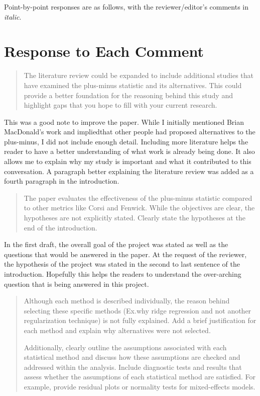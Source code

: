 \documentclass[12pt]{article}
\newenvironment{comment}%
{\begin{quotation}\noindent\small\it\ignorespaces%
  }{\end{quotation}}
\begin{document}
Point-by-point responses are as follows, with the reviewer/editor's comments in {\it italic}.


\section{Response to Each Comment}

\begin{comment}
  The literature review could be expanded to include additional studies that 
  have examined the plus-minus statistic and its alternatives. This could provide 
  a better foundation for the reasoning behind this study and highlight gaps
  that you hope to fill with your current research.
\end{comment}

This was a good note to improve the paper. While I initially mentioned Brian MacDonald's 
work and impliedthat other people had proposed alternatives to the plus-minus, I did not 
include enough detail. Including more literature helps the reader to have a better understanding
of what work is already being done. It also allows me to explain why my study is 
important and what it contributed to this conversation. A paragraph better explaining 
the literature review was added as a fourth paragraph in the introduction.


\begin{comment}
  The paper evaluates the effectiveness of the plus-minus statistic compared 
  to other metrics like Corsi and Fenwick. While the objectives are clear, the 
  hypotheses are not explicitly stated. Clearly state the hypotheses at the end 
  of the introduction.
\end{comment}

In the first draft, the overall goal of the project was stated as well as the 
questions that would be answered in the paper. At the request of the reviewer,
the hypothesis of the project was stated in the second to last sentence of the
introduction. Hopefully this helps the readers to understand the over-arching 
question that is being answered in this project.

\begin{comment}
  Although each method is described individually, the reason behind selecting these 
  specific methods (Ex.why ridge regression and not another regularization technique) 
  is not fully explained. Add a brief justification for each method and explain why 
  alternatives were not selected.

  Additionally, clearly outline the assumptions associated with each statistical 
  method and discuss how these assumptions are checked and addressed within the 
  analysis. Include diagnostic tests and results that assess whether the assumptions 
  of each statistical method are satisfied. For example, provide residual plots 
  or normality tests for mixed-effects models.
\end{comment}
\end{document}
